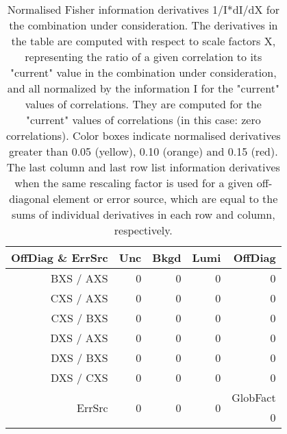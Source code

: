 \begin{table}[H]
\scriptsize
\begin{center}
\renewcommand{\arraystretch}{1.1}
\begin{tabular}{|r|rrr|r|}
\hline
 OffDiag \& ErrSrc & {\tiny Unc} & {\tiny Bkgd} & {\tiny Lumi} & OffDiag\\
\hline
BXS / AXS &  0 &  0 &  0 &  0 \\
CXS / AXS &  0 &  0 &  0 &  0 \\
CXS / BXS &  0 &  0 &  0 &  0 \\
DXS / AXS &  0 &  0 &  0 &  0 \\
DXS / BXS &  0 &  0 &  0 &  0 \\
DXS / CXS &  0 &  0 &  0 &  0 \\
\hline
\multirow{2}{*}{ErrSrc} & \multirow{2}{*}{ 0} & \multirow{2}{*}{ 0} & \multirow{2}{*}{ 0} & GlobFact\\
 & & & &  0 \\
\hline
\end{tabular}
\renewcommand{\arraystretch}{1}
\caption{Normalised Fisher information derivatives 1/I*dI/dX for the combination under consideration. The derivatives in the table are computed with respect to scale factors X, representing the ratio of a given correlation to its "current" value in the combination under consideration, and all normalized by the information I for the "current" values of correlations. They are computed for the "current" values of correlations (in this case: zero correlations). Color boxes indicate normalised derivatives greater than 0.05 (yellow), 0.10 (orange) and 0.15 (red). The last column and last row list information derivatives when the same rescaling factor is used for a given off-diagonal element or error source, which are equal to the sums of individual derivatives in each row and column, respectively.}
\end{center}
\end{table}
